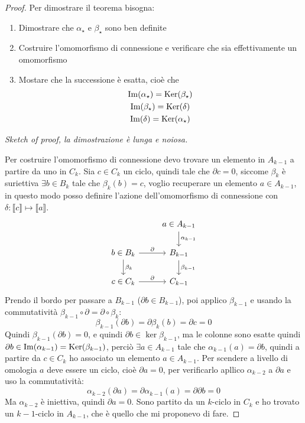 \begin{proof}
  Per dimostrare il teorema bisogna:
  \begin{enumerate}
  \item Dimostrare che $ \alpha_\star $ e $ \beta_\star $ sono ben definite
  \item Costruire l'omomorfismo di connessione e verificare che sia effettivamente un omomorfismo
  \item Mostare che la successione è esatta, cioè che
    \begin{gather*}
      \mathrm{Im}( \alpha_\star ) = \mathrm{Ker}( \beta_\star) \\
      \mathrm{Im}( \beta_\star ) = \mathrm{Ker}( \delta) \\
      \mathrm{Im}( \delta ) = \mathrm{Ker}( \alpha_\star)
    \end{gather*}
  \end{enumerate}
  \emph{Sketch of proof, la dimostrazione è lunga e noiosa.}

  Per costruire l'omomorfismo di connessione devo trovare un
  elemento in $ A_{k-1} $ a partire da uno in $ C_k $.
  Sia $ c \in C_k $ un ciclo, quindi tale che $ \partial c = 0 $,
  siccome $ \beta_k $ è suriettiva $ \exists b \in B_k $ tale che
  $ \beta_k(b) = c $, voglio recuperare un elemento $ a \in A_{k-1} $,
  in questo modo posso definire l'azione dell'omomorfismo
  di connessione con $ \delta \colon \llbracket c \rrbracket \mapsto \llbracket a \rrbracket $.
  \[
    \begin{tikzcd}
      {} & a \in A_{k-1} \arrow{d}{\alpha_{k-1}} \\
      b \in B_k \arrow{r}{\partial} \arrow{d}{\beta_k} & B_{k-1} \arrow{d}{\beta_{k-1}} \\
      c \in C_k \arrow{r}{\partial} & C_{k-1}
    \end{tikzcd}
  \]
  Prendo il bordo per passare a $ B_{k-1} $ ($ \partial b \in B_{k-1} $), poi
  applico $ \beta_{k-1} $ e usando la commutatività $ \beta_{k-1} \circ \partial = \partial \circ \beta_k $:
  \[
    \beta_{k-1}(\partial b) = \partial \beta_k (b) = \partial c = 0
  \]
  Quindi $ \beta_{k-1}(\partial b) = 0 $, e quindi $ \partial b \in \ker{\beta_{k-1}} $, ma
  le colonne sono esatte quindi $ \partial b \in \mathrm{Im}( \alpha_{k-1} ) = \mathrm{Ker}( \beta_{k-1}) $,
  perciò $ \exists a \in A_{k-1} $ tale che $ \alpha_{k-1}(a) = \partial b $, quindi
  a partire da $ c \in C_k $ ho associato un elemento $ a \in A_{k-1} $.
  Per scendere a livello di omologia $ a $ deve essere un ciclo,
  cioè $ \partial a = 0 $, per verificarlo apllico $ \alpha_{k-2} $ a $ \partial a $
  e uso la commutatività:
  \[
    \alpha_{k-2}(\partial a) = \partial \alpha_{k-1}(a) = \partial \partial b = 0
  \]
  Ma $ \alpha_{k-2} $ è iniettiva, quindi $ \partial a = 0 $.
  Sono partito da un $ k $-ciclo in $ C_k $ e
  ho trovato un $ k-1 $-ciclo in $ A_{k-1} $,
  che è quello che mi proponevo di fare.


\end{proof}
